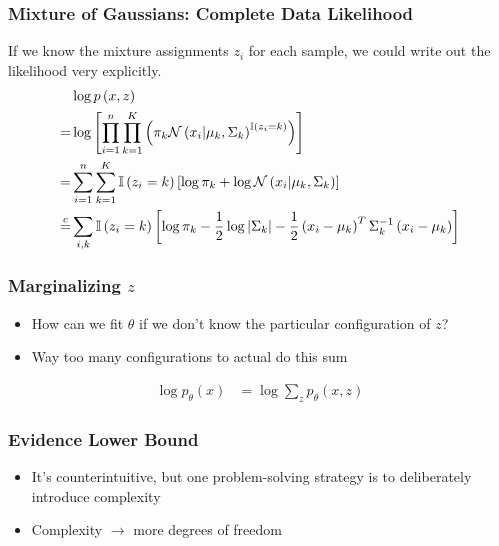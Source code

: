 \documentclass[10pt,mathserif]{beamer}
\begin{document}
\begin{frame}
  \frametitle{Mixture of Gaussians: Complete Data Likelihood}
  If we know the mixture assignments $z_i$ for each sample, we could write out
  the likelihood very explicitly.
  \begin{align*}
    &\log p\left(x, z\right) \\
    = &\log \left[\prod_{i = 1}^{n} \prod_{k = 1}^{K}
  \left(\pi_{k}\mathcal{N}\left(x_i \vert \mu_k, \Sigma_k\right)^{\mathbb{I}\left({z_i =
      k}\right)}\right)\right] \\
= &\sum_{i = 1}^{n} \sum_{k = 1}^{K} \mathbb{I}\left({z_i = k}\right) \left[\log \pi_{k} + \log
  \mathcal{N}\left(x_i \vert \mu_k, \Sigma_k\right)\right] \\
\stackrel{c}{=} &\sum_{i, k}\mathbb{I}\left({z_i = k}\right)
\left[\log \pi_{k} -
  \frac{1}{2}\log \left|\Sigma_k\right| - \frac{1}{2} \left(x_i -
  \mu_k\right)^{T}\Sigma^{-1}_{k} \left(x_i - \mu_k\right)\right]
  \end{align*}
\end{frame}

\begin{frame}
  \frametitle{Marginalizing $z$}
  \begin{itemize}
  \item How can we fit $\theta$ if we don't know the particular configuration of
    $z$?
  \item Way too many configurations to actual do this sum
  \end{itemize}
  \begin{align*}
    \log p_{\theta}\left(x\right) &= \log \sum_{z} p_{\theta}\left(x, z\right)
  \end{align*}
\end{frame}

\begin{frame}
  \frametitle{Evidence Lower Bound}
  \begin{itemize}
  \item It's counterintuitive, but one problem-solving strategy is to
    deliberately introduce complexity
  \item Complexity $\rightarrow$ more degrees of freedom
  \end{itemize}
\end{frame}
\end{document}
